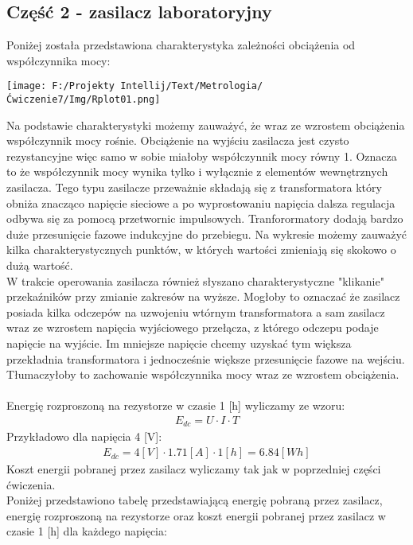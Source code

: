 \documentclass[11pt]{article}
\begin{document}
    \subsection*{Część 2 - zasilacz laboratoryjny}
    Poniżej została przedstawiona charakterystyka zależności obciążenia od współczynnika mocy:
    \begin{center}
        \texttt{[image: F:/Projekty Intellij/Text/Metrologia/Ćwiczenie7/Img/Rplot01.png]}
    \end{center}
    \par Na podstawie charakterystyki możemy zauważyć, że wraz ze wzrostem obciążenia współczynnik mocy rośnie. Obciążenie na wyjściu zasilacza jest czysto
    rezystancyjne więc samo w sobie miałoby współczynnik mocy równy 1. Oznacza to że współczynnik mocy wynika tylko i wyłącznie z elementów wewnętrznych
    zasilacza. Tego typu zasilacze przeważnie składają się z transformatora który obniża znacząco napięcie sieciowe a po wyprostowaniu napięcia dalsza
    regulacja odbywa się za pomocą przetwornic impulsowych. Tranforormatory dodają bardzo duże przesunięcie fazowe indukcyjne do przebiegu. Na wykresie
    możemy zauważyć kilka charakterystycznych punktów, w których wartości zmieniają się skokowo o dużą wartość.\\
    \indent W trakcie operowania zasilacza również słyszano charakterystyczne "klikanie" \newline przekaźników przy zmianie zakresów na wyższe. Mogłoby to oznaczać że zasilacz posiada kilka odczepów na
    uzwojeniu wtórnym transformatora a sam zasilacz wraz ze wzrostem napięcia wyjściowego przełącza, z którego odczepu podaje napięcie na wyjście.
    Im mniejsze napięcie chcemy uzyskać tym większa przekładnia transformatora i jednocześnie większe przesunięcie fazowe na wejściu. Tłumaczyłoby to
    zachowanie współczynnika mocy wraz ze wzrostem obciążenia.\\
    \\
    \noindent Energię rozproszoną na rezystorze w czasie 1 [h] wyliczamy ze wzoru:
    \begin{gather*}
        E_{dc}=U\cdot I\cdot T
    \end{gather*}
    \noindent Przykładowo dla napięcia 4 [V]:
    \begin{gather*}
        E_{dc}=4[V]\cdot 1.71[A]\cdot 1[h]=6.84[Wh]
    \end{gather*}
    \indent Koszt energii pobranej przez zasilacz wyliczamy tak jak w poprzedniej części ćwiczenia.\\
    Poniżej przedstawiono tabelę przedstawiającą energię pobraną przez zasilacz, energię rozproszoną na rezystorze oraz koszt
    energii pobranej przez zasilacz w czasie 1 [h] dla każdego napięcia:
    \begin{center}
    \end{center}
\end{document}
